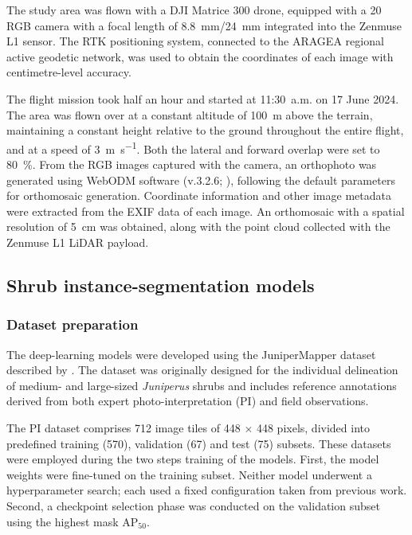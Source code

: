 \documentclass[12pt,a4paper]{article}
\begin{document}
The study area was flown with a DJI Matrice 300 drone, equipped with a \qty{20}{\mega\pixel} RGB camera with a focal length of \qty{8.8}{\milli\metre}/\qty{24}{\milli\metre} integrated into the Zenmuse L1 sensor. The RTK positioning system, connected to the ARAGEA regional active geodetic network, was used to obtain the coordinates of each image with centimetre-level accuracy.

The flight mission took half an hour and started at 11:30~a.m. on 17 June 2024. The area was flown over at a constant altitude of \qty{100}{\metre} above the terrain, maintaining a constant height relative to the ground throughout the entire flight, and at a speed of \qty{3}{\metre\per\second}. Both the lateral and forward overlap were set to \qty{80}{\percent}. From the RGB images captured with the camera, an orthophoto was generated using WebODM software (v.3.2.6; \citealp{webodm}), following the default parameters for orthomosaic generation. Coordinate information and other image metadata were extracted from the EXIF data of each image. An orthomosaic with a spatial resolution of \qty{5}{\centi\metre} was obtained, along with the point cloud collected with the Zenmuse L1 LiDAR payload.

\subsection{Shrub instance-segmentation models}

\subsubsection{Dataset preparation}

The deep-learning models were developed using the JuniperMapper dataset described by \citet{khaldi2023junipermapper}. The dataset was originally designed for the individual delineation of medium- and large-sized \textit{Juniperus} shrubs and includes reference annotations derived from both expert photo-interpretation (PI) and field observations.

The PI dataset comprises 712 image tiles of 448 $\times$ 448 pixels, divided into predefined training (570), validation (67) and test (75) subsets. These datasets were employed during the two steps training of the models. First, the model weights were fine-tuned on the training subset. Neither model underwent a hyperparameter search; each used a fixed configuration taken from previous work. Second, a checkpoint selection phase was conducted on the validation subset using the highest mask AP$_{50}$.
\end{document}
